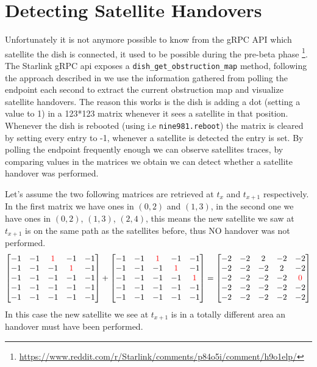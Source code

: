 \documentclass[IN,11pt,twoside,openright,bachelor,english]{tumthesis}
\begin{document}
\section{Detecting Satellite Handovers}

Unfortunately it is not anymore possible to know from the gRPC API which satellite the dish is connected, it used to be possible during the pre-beta phase \footnote{\url{https://www.reddit.com/r/Starlink/comments/p84o5i/comment/h9o1elp/}}.
The Starlink gRPC api exposes a \texttt{dish\_get\_obstruction\_map} method, following the approach described in \cite{izhikevich2023democratizing} we use the information gathered from polling the endpoint each second to extract the current obstruction map and visualize satellite handovers. The reason this works is the dish is adding a dot (setting a value to 1) in a 123*123 matrix whenever it sees a satellite in that position. Whenever the dish is rebooted (using i.e \texttt{nine981.reboot}) the matrix is cleared by setting every entry to -1, whenever a satellite is detected the entry is set. By polling the endpoint frequently enough we can observe satellites traces, by comparing values in the matrices we obtain we can detect whether a satellite handover was performed.


Let's assume the two following matrices are retrieved at $ t_x $ and $ t_{x+1} $ respectively. In the first matrix we have ones in $ (0,2) $ and $ (1,3) $, in the second one we have ones in $ (0,2) $, $ (1,3) $, $ (2,4) $, this means the new satellite we saw at $ t_{x+1} $ is on the same path as the satellites before, thus NO handover was not performed.
\[
\begin{bmatrix}
-1 & -1 & \color{red}1 & -1 & -1 \\
-1 & -1 & -1 & \color{red}1 & -1 \\
-1 & -1 & -1 & -1 & -1 \\
-1 & -1 & -1 & -1 & -1 \\
-1 & -1 & -1 & -1 & -1 \\ 
\end{bmatrix}
+
\begin{bmatrix}
-1 & -1 & \color{red}1 & -1 & -1 \\
-1 & -1 & -1 & \color{red}1 & -1 \\
-1 & -1 & -1 & -1 & \color{red}1 \\
-1 & -1 & -1 & -1 & -1 \\
-1 & -1 & -1 & -1 & -1 \\
\end{bmatrix}
=
\begin{bmatrix}
-2 & -2 & 2 & -2 & -2 \\
-2 & -2 & -2 & 2 & -2 \\
-2 & -2 & -2 & -2 & \color{red}0 \\
-2 & -2 & -2 & -2 & -2 \\
-2 & -2 & -2 & -2 & -2 \\
\end{bmatrix}
\]
In this case the new satellite we see at $ t_{x+1} $ is in a totally different area an handover must have been performed.
\end{document}
